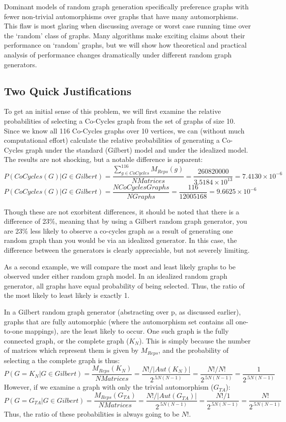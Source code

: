 Dominant models of random graph generation specifically preference graphs with fewer non-trivial automorphisms over graphs that have many automorphisms. 
This flaw is most glaring when discussing average or worst case running time over the `random' class of graphs.
Many algorithms make exciting claims about their performance on `random' graphs, but
we will show how theoretical and practical analysis of performance changes dramatically under different random graph generators.

\subsection{Two Quick Justifications}

To get an initial sense of this problem, we will first examine the relative probabilities of selecting a Co-Cycles graph from the set of graphs of size 10.
Since we know all 116 Co-Cycles graphs over 10 vertices, we can (without much computational effort) calculate the relative probabilities of generating a Co-Cycles graph under the standard (Gilbert) model and under the idealized model.
The results are not shocking, but a notable difference is apparent:
$$P(CoCycles(G) | G \in Gilbert) = \frac{\sum_{g \in CoCycles}^{116}M_{Reps}(g)}{N Matrices} = \frac{260820000}{3.5184 \times 10^{13}} = 7.4130 \times 10^{-6}$$
$$P(CoCycles(G) | G \in Gilbert) = \frac{N CoCycles Graphs}{N Graphs} = \frac{116}{12005168} = 9.6625 \times 10^{-6}$$

Though these are not exorbitent differences, it should be noted that there is a difference of 23\%, meaning that by using a Gilbert random graph generator, you are 23\% less likely to observe a co-cycles graph as a result of generating one random graph than you would be via an idealized generator.
In this case, the difference between the generators is clearly appreciable, but not severely limiting.

As a second example, we will compare the most and least likely graphs to be observed under either random graph model.
In an idealized random graph generator, all graphs have equal probability of being selected.
Thus, the ratio of the most likely to least likely is exactly 1.

In a Gilbert random graph generator (abstracting over p, as discussed earlier), graphs that are fully automorphic (where the automorphism set contains all one-to-one mappings), are the least likely to occur.
One such graph is the fully connected graph, or the complete graph ($K_N$).
This is simply because the number of matrices which represent them is given by $M_{Reps}$, and the probability of selecting a the complete graph is thus:
$$P(G = K_N | G \in Gilbert) =  \frac{M_{Reps}(K_N)}{NMatrices} = \frac{N! / |Aut(K_N)|}{2^{.5N(N-1)}} = \frac{N! / N!}{2^{.5N(N-1)}} = \frac{1}{2^{.5N(N-1)}}$$
However, if we examine a graph with only the trivial automorphism ($G_{TA}$):
$$P(G = G_{TA} | G \in Gilbert) =  \frac{M_{Reps}(G_{TA})}{NMatrices} = \frac{N! / |Aut(G_{TA})|}{2^{.5N(N-1)}} = \frac{N! / 1}{2^{.5N(N-1)}} = \frac{N!}{2^{.5N(N-1)}}$$
Thus, the ratio of these probabilities is always going to be $N!$.

